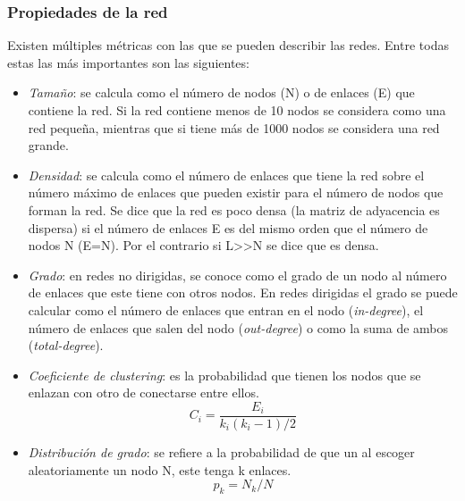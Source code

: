 \subsubsection{Propiedades de la red}
Existen múltiples métricas con las que se pueden describir las redes. Entre todas estas las más importantes son las siguientes:  
\begin{itemize}
    \item \textit{Tamaño}: se calcula como el número de nodos (N) o de enlaces (E) que contiene la red. Si la red contiene menos de 10 nodos se considera como una red pequeña, mientras que si tiene más de 1000 nodos se considera una red grande.
    
    \item \textit{Densidad}: se calcula como el número de enlaces que tiene la red sobre el número máximo de enlaces que pueden existir para el número de nodos que forman la red. Se dice que la red es poco densa (la matriz de adyacencia es dispersa) si el número de enlaces E es del mismo orden que el número de nodos N (E=N). Por el contrario si L>>N se dice que es densa.
    
    \item \textit{Grado}: en redes no dirigidas, se conoce como el grado de un nodo al número de enlaces que este tiene con otros nodos. En redes dirigidas el grado se puede calcular como el número de enlaces que entran en el nodo (\textit{in-degree}), el número de enlaces que salen del nodo (\textit{out-degree}) o como la suma de ambos (\textit{total-degree}).
    
    \item \textit{Coeficiente de clustering}: es la probabilidad que tienen los nodos que se enlazan con otro de conectarse entre ellos. \[ C_{i}= \frac{E_{i}}{k_{i}(k_{i}−1)/2} \]
    
    \item \textit{Distribución de grado}: se refiere a la probabilidad de que un al escoger aleatoriamente un nodo N, este tenga k enlaces. \[ p_{k} = N_{k}/N \]
    
\end{itemize}

